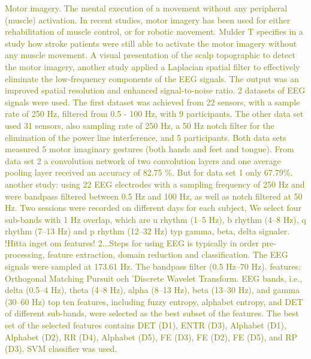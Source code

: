 \textcolor{olive}{Motor imagery. The mental execution of a movement without any peripheral (muscle) activation. In recent studies, motor imagery has been used for either rehabilitation of muscle control, or for robotic movement. Mulder T\cite{mulderMotorImageryAction2007} specifies in a study how stroke patients were still able to activate the motor imagery without any muscle movement.
	A visual presentation of the scalp topographic to detect the motor imagery, another study applied a Laplacian spatial filter to effectively eliminate the low-frequency components of the EEG signals\cite{tangSpatialFilterTemporal2024}. The output was an improved spatial resolution and enhanced signal-to-noise ratio.
	2 datasets of EEG signals were used. The first dataset was achieved from 22 sensors, with a sample rate of 250 Hz, filtered from 0.5 - 100 Hz, with 9 participants. The other data set used 31 sensors, also sampling rate of 250 Hz, a 50 Hz notch filter for the elimination of the power line interference, and 5 participants.
	Both data sets measured 5 motor imaginary gestures (both hands and feet and tongue).
	From data set 2 a convolution network of two convolution layers and one average pooling layer received an accuracy of  82.75 \%. But for data set 1 only 67.79\%.
	another study:
	using 22 EEG electrodes with a sampling frequency of
	250 Hz and were bandpass filtered between 0.5 Hz and 100 Hz, as well
	as notch filtered at 50 Hz.
	Two sessions were recorded on different days for each subject,
	We select four sub-bands with 1 Hz overlap, which are u rhythm (1–5 Hz), b rhythm (4–8 Hz), q rhythm (7–13 Hz) and p rhythm (12–32 Hz) typ gamma, beta, delta signaler.
	!Hitta inget om features!
	2...Steps for using EEG is typically in order pre-processing, feature extraction, domain reduction and classification.
	The EEG signals were sampled at 173.61 Hz.
	The bandpass filter (0.5 Hz–70 Hz).
	features: Orthogonal Matching Pursuit och 'Discrete Wavelet Transform.
	EEG bands, i.e., delta
	(0.5–4 Hz), theta (4–8 Hz), alpha (8–13 Hz), beta (13–30 Hz), and
	gamma (30–60 Hz)
	top ten features, including fuzzy entropy, alphabet entropy, and DET of
	different sub-bands, were selected as the best subset of the features. The
	best set of the selected features contains DET (D1), ENTR (D3), Alphabet
	(D1), Alphabet (D2), RR (D4), Alphabet (D5), FE (D3), FE (D2), FE (D5),
	and RP (D3).
	SVM classifier was used.
}
